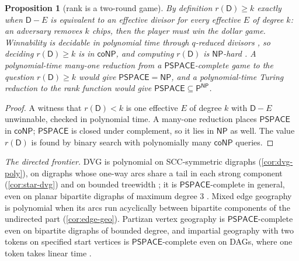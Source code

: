 \documentclass[11pt]{amsart}
\theoremstyle{plain}
\newtheorem{proposition}[theorem]{Proposition}
\theoremstyle{definition}
\theoremstyle{remark}
\numberwithin{equation}{section}
\newcommand{\Dv}{\mathsf{D}}              %
\newcommand{\cls}[1]{\mathsf{#1}}
\newcommand{\PSPACE}{\cls{PSPACE}}
\newcommand{\NP}{\cls{NP}}
\newcommand{\coNP}{\cls{coNP}}
\newcommand{\Pclass}{\cls{P}}
\begin{document}
\begin{proposition}[rank is a two-round game]\label{prop:rank-game}
By definition $r(\Dv)\ge k$ exactly when $\Dv-E$ is equivalent to an effective divisor for every effective $E$ of degree $k$: an adversary removes $k$ chips, then the player must win the dollar game. Winnability is decidable in polynomial time through $q$-reduced divisors \cite{BakerNorine,BakerShokrieh}, so deciding $r(\Dv)\ge k$ is in $\coNP$, and computing $r(\Dv)$ is $\NP$-hard \cite{KissToth}. A polynomial-time many-one reduction from a $\PSPACE$-complete game to the question $r(\Dv)\ge k$ would give $\PSPACE=\NP$, and a polynomial-time Turing reduction to the rank function would give $\PSPACE\subseteq\Pclass^{\NP}$.
\end{proposition}
\begin{proof}
A witness that $r(\Dv)<k$ is one effective $E$ of degree $k$ with $\Dv-E$ unwinnable, checked in polynomial time. A many-one reduction places $\PSPACE$ in $\coNP$; $\PSPACE$ is closed under complement, so it lies in $\NP$ as well. The value $r(\Dv)$ is found by binary search with polynomially many $\coNP$ queries.
\end{proof}

\noindent\emph{The directed frontier.} DVG is polynomial on SCC-symmetric digraphs (\cref{cor:dvg-poly}), on digraphs whose one-way arcs share a tail in each strong component (\cref{cor:star-dvg}) and on bounded treewidth \cite{Bodlaender}; it is $\PSPACE$-complete in general, even on planar bipartite digraphs of maximum degree $3$ \cite{LichtensteinSipser}. Mixed edge geography is polynomial when its arcs run acyclically between bipartite components of the undirected part (\cref{cor:edge-geo}). Partizan vertex geography is $\PSPACE$-complete even on bipartite digraphs of bounded degree, and impartial geography with two tokens on specified start vertices is $\PSPACE$-complete even on DAGs, where one token takes linear time \cite{FraenkelSimonson}.
\end{document}
